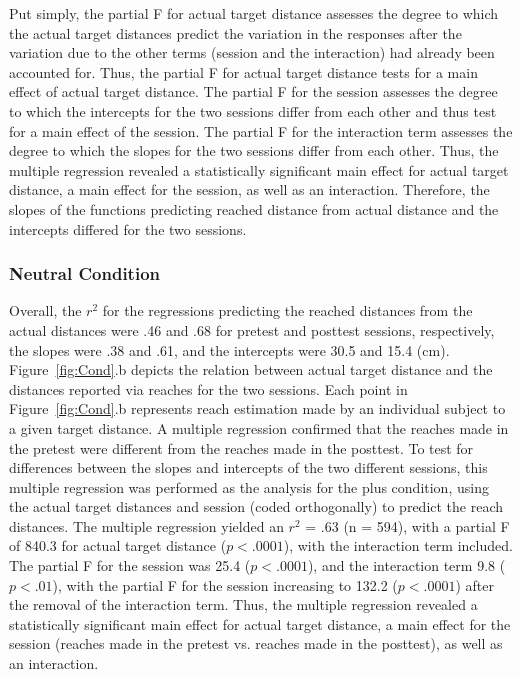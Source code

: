 Put simply, the partial F for actual target distance assesses the degree to which the actual target distances predict the variation in the responses after the variation due to the other terms (session and the interaction) had already been accounted for. Thus, the partial F for actual target distance tests for a main effect of actual target distance. The partial F for the session assesses the degree to which the intercepts for the two sessions differ from each other and thus test for a main effect of the session. The partial F for the interaction term assesses the degree to which the slopes for the two sessions differ from each other. Thus, the multiple regression revealed a statistically significant main effect for actual target distance, a main effect for the session, as well as an interaction. Therefore, the slopes of the functions predicting reached distance from actual distance and the intercepts differed for the two sessions.


\subsubsection{Neutral Condition}

Overall, the $r^2$ for the regressions predicting the reached distances from the actual distances were .46 and .68 for pretest and posttest sessions, respectively, the slopes were .38 and .61, and the intercepts were 30.5 and 15.4 (cm). Figure~\ref{fig:Cond}.b depicts the relation between actual target distance and the distances reported via reaches for the two sessions. Each point in Figure~\ref{fig:Cond}.b represents reach estimation made by an individual subject to a given target distance. A multiple regression confirmed that the reaches made in the pretest were different from the reaches made in the posttest. To test for differences between the slopes and intercepts of the two different sessions, this multiple regression was performed as the analysis for the plus condition, using the actual target distances and session (coded orthogonally) to predict the reach distances. The multiple regression yielded an $r^2$ = .63 (n = 594), with a partial F of 840.3 for actual target distance ($p < .0001$), with the interaction term included. The partial F for the session was 25.4 ($p < .0001$), and the interaction term 9.8 ($p < .01$), with the partial F for the session increasing to 132.2 ($p < .0001$) after the removal of the interaction term. Thus, the multiple regression revealed a statistically significant main effect for actual target distance, a main effect for the session (reaches made in the pretest vs. reaches made in the posttest), as well as an interaction.


